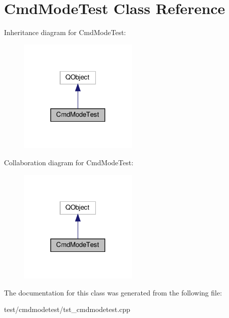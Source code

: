 \hypertarget{classCmdModeTest}{}\section{Cmd\+Mode\+Test Class Reference}
\label{classCmdModeTest}


Inheritance diagram for Cmd\+Mode\+Test\+:
\nopagebreak
\begin{figure}[H]
\begin{center}
\leavevmode
\includegraphics[width=161pt]{classCmdModeTest__inherit__graph}
\end{center}
\end{figure}


Collaboration diagram for Cmd\+Mode\+Test\+:
\nopagebreak
\begin{figure}[H]
\begin{center}
\leavevmode
\includegraphics[width=161pt]{classCmdModeTest__coll__graph}
\end{center}
\end{figure}


The documentation for this class was generated from the following file\+:\begin{DoxyCompactItemize}
\item 
test/cmdmodetest/tst\+\_\+cmdmodetest.\+cpp\end{DoxyCompactItemize}
